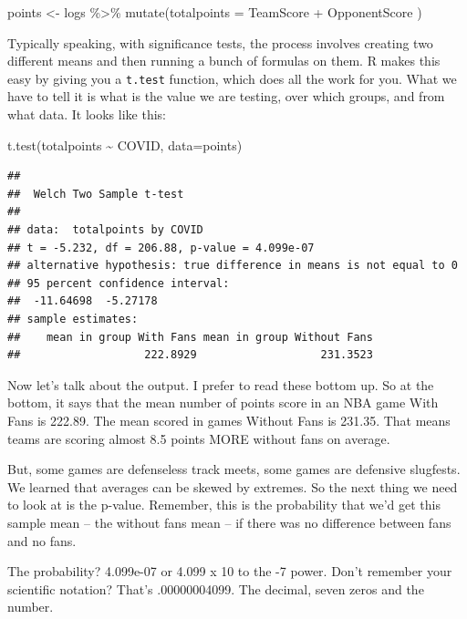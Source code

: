\documentclass[
]{book}
\newenvironment{Shaded}{\begin{snugshade}}{\end{snugshade}}
\newcommand{\AttributeTok}[1]{\textcolor[rgb]{0.77,0.63,0.00}{#1}}
\newcommand{\FunctionTok}[1]{\textcolor[rgb]{0.00,0.00,0.00}{#1}}
\newcommand{\NormalTok}[1]{#1}
\newcommand{\OtherTok}[1]{\textcolor[rgb]{0.56,0.35,0.01}{#1}}
\newcommand{\SpecialCharTok}[1]{\textcolor[rgb]{0.00,0.00,0.00}{#1}}
\begin{document}
\begin{Shaded}
\begin{Highlighting}[]
\NormalTok{points }\OtherTok{\textless{}{-}}\NormalTok{ logs }\SpecialCharTok{\%\textgreater{}\%} \FunctionTok{mutate}\NormalTok{(}\AttributeTok{totalpoints =}\NormalTok{ TeamScore }\SpecialCharTok{+}\NormalTok{ OpponentScore )}
\end{Highlighting}
\end{Shaded}

Typically speaking, with significance tests, the process involves creating two different means and then running a bunch of formulas on them. R makes this easy by giving you a \texttt{t.test} function, which does all the work for you. What we have to tell it is what is the value we are testing, over which groups, and from what data. It looks like this:

\begin{Shaded}
\begin{Highlighting}[]
\FunctionTok{t.test}\NormalTok{(totalpoints }\SpecialCharTok{\textasciitilde{}}\NormalTok{ COVID, }\AttributeTok{data=}\NormalTok{points)}
\end{Highlighting}
\end{Shaded}

\begin{verbatim}
## 
##  Welch Two Sample t-test
## 
## data:  totalpoints by COVID
## t = -5.232, df = 206.88, p-value = 4.099e-07
## alternative hypothesis: true difference in means is not equal to 0
## 95 percent confidence interval:
##  -11.64698  -5.27178
## sample estimates:
##    mean in group With Fans mean in group Without Fans 
##                   222.8929                   231.3523
\end{verbatim}

Now let's talk about the output. I prefer to read these bottom up. So at the bottom, it says that the mean number of points score in an NBA game With Fans is 222.89. The mean scored in games Without Fans is 231.35. That means teams are scoring almost 8.5 points MORE without fans on average.

But, some games are defenseless track meets, some games are defensive slugfests. We learned that averages can be skewed by extremes. So the next thing we need to look at is the p-value. Remember, this is the probability that we'd get this sample mean -- the without fans mean -- if there was no difference between fans and no fans.

The probability? 4.099e-07 or 4.099 x 10 to the -7 power. Don't remember your scientific notation? That's .00000004099. The decimal, seven zeros and the number.
\end{document}
